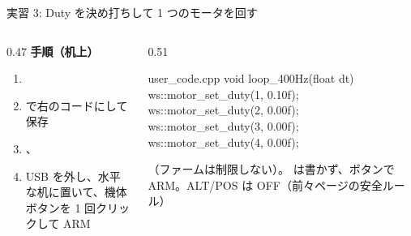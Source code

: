\begin{frame}[fragile]{実習 3: Duty を決め打ちして 1 つのモータを回す}
  \begin{columns}[T]
    \begin{column}{0.47\textwidth}
      {\footnotesize\textbf{\textcolor{sfblue}{手順（机上）}}}\par\vspace{-2pt}
      \footnotesize
      \begin{enumerate}\setlength{\itemsep}{0pt}
        \item {}
        \item {} で右のコードにして保存
        \item {}、
        \item USB を外し、水平な机に置いて、機体ボタンを 1 回クリックして ARM
      \end{enumerate}
    \end{column}
    \begin{column}{0.51\textwidth}
      \begin{sflisting}[basicstyle=\ttfamily\scriptsize]{user\_code.cpp}
void loop_400Hz(float dt) {
    ws::motor_set_duty(1, 0.10f);
    ws::motor_set_duty(2, 0.00f);
    ws::motor_set_duty(3, 0.00f);
    ws::motor_set_duty(4, 0.00f);
}
      \end{sflisting}
      {\scriptsize {}（ファームは制限しない）。 は書かず、ボタンで ARM。ALT/POS は OFF（前々ページの安全ルール）\par}
    \end{column}
  \end{columns}
\end{frame}

